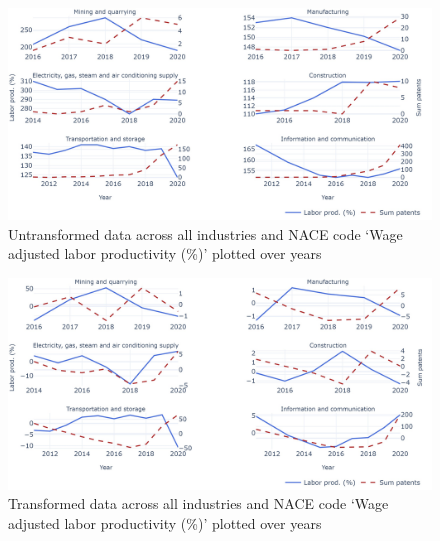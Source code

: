 \documentclass[
  12pt,
  a4paperpaper,
]{article}
\begin{document}
\begin{figure}[H]

{\centering \includegraphics{rieg2023_files/figure-pdf/fig-untransformed-data-labor-prod-output-1.jpeg}

}

\caption{\label{fig-untransformed-data-labor-prod}Untransformed data
across all industries and NACE code `Wage adjusted labor productivity
(\%)' plotted over years}

\end{figure}

\begin{figure}[H]

{\centering \includegraphics{rieg2023_files/figure-pdf/fig-transformed-data-labor-prod-output-1.jpeg}

}

\caption{\label{fig-transformed-data-labor-prod}Transformed data across
all industries and NACE code `Wage adjusted labor productivity (\%)'
plotted over years}

\end{figure}
\end{document}
